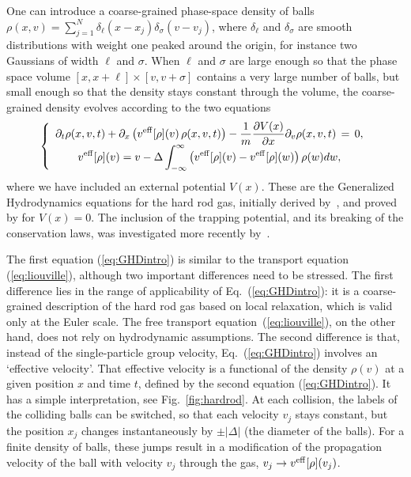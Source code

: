 \documentclass[onecolumn,amsfonts,showpacs,superscriptaddress]{revtex4-1}
\begin{document}
One can introduce a coarse-grained phase-space density of balls $\rho(x,v) = \sum_{j=1}^N \delta_\ell (x-x_j) \delta_\sigma (v-v_j)$, where $\delta_\ell$ and $\delta_\sigma$ are smooth distributions with weight one peaked around the origin, for instance two Gaussians of width $\ell$ and $\sigma$. When $\ell$ and $\sigma$ are large enough so that the phase space volume $[x,x+ \ell] \times [v,v+\sigma]$ contains a very large number of balls, but small enough so that the density stays constant through the volume, the coarse-grained density evolves according to the two equations
\begin{equation}
    \label{eq:GHDintro}
    \left\{ \begin{array}{c}
       \displaystyle \partial_t \rho(x,v,t) + \partial_x \left( v^{\rm eff}[\rho](v) \, \rho(x,v,t) \right) - \frac{1}{m}\frac{\partial V(x)}{\partial x} \partial_v \rho(x,v,t) \, = \, 0, \\
       \displaystyle  v^{\rm eff}[\rho](v) = v - \Delta  \int_{-\infty}^\infty   \left( v^{\rm eff}[\rho](v) - v^{\rm eff}[\rho](w) \right)  \rho(w) dw ,
    \end{array} \right.
\end{equation}
where we have included an external potential $V(x)$. These are the Generalized Hydrodynamics equations for the hard rod gas, initially derived by~\cite{percus1976equilibrium}, and proved by \cite{boldrighini1983one} for $V(x)=0$. The inclusion of the trapping potential, and its breaking of the conservation laws, was investigated more recently by~\cite{cao2018incomplete}.


The first equation (\ref{eq:GHDintro}) is similar to the transport equation (\ref{eq:liouville}), although two important differences need to be stressed. The first difference lies in the range of applicability of Eq.~(\ref{eq:GHDintro}): it is a  coarse-grained description of the hard rod gas based on local relaxation, which is valid only at the Euler scale. The free transport equation~(\ref{eq:liouville}), on the other hand, does not rely on hydrodynamic assumptions. The second difference is that, instead of the single-particle group velocity, Eq.~(\ref{eq:GHDintro}) involves an `effective velocity'. That effective velocity is a functional of the density $\rho(v)$ at a given position $x$ and time $t$, defined by the second equation (\ref{eq:GHDintro}). It has a simple interpretation, see Fig.~\ref{fig:hardrod}. At each collision, the labels of the colliding balls can be switched, so that each velocity $v_j$ stays constant, but the position $x_j$ changes instantaneously by $\pm |\Delta|$ (the diameter of the balls). For a finite density of balls, these jumps result in a modification of the propagation velocity of the ball with velocity $v_j$ through the gas, $v_j \rightarrow v^{\rm eff}[\rho](v_j)$.
\end{document}
